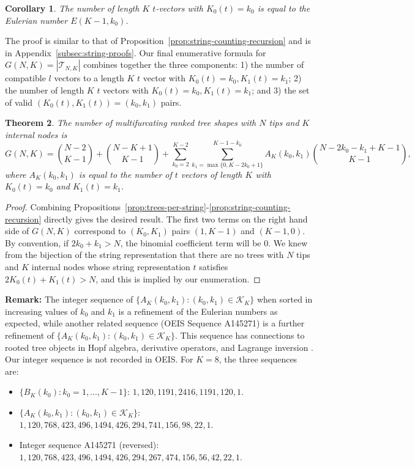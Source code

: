 \documentclass{article}
\newtheorem{theorem}{Theorem}
\newtheorem{corollary}[theorem]{Corollary}
\begin{document}
\begin{corollary}\label{eq:k0_cardinality}
The number of length $K$ $t$-vectors with $K_0(t)=k_0$ is equal to the Eulerian number $E(K-1, k_0)$.
\end{corollary}

The proof is similar to that of Proposition~\ref{prop:string-counting-recursion} and is in Appendix~\ref{subsec:string-proofs}. Our final enumerative formula for $G(N,K)=|\mathcal{T}_{N,K}|$ combines together the three components: 1) the number of compatible $l$ vectors to a length $K$ $t$ vector with $K_0(t)= k_0, K_1(t)= k_1$; 2) the number of length $K$ $t$ vectors with $K_0(t)= k_0, K_1(t)= k_1$; and 3) the set of valid $(K_0(t), K_1(t)) = (k_0, k_1)$ pairs. 

\begin{theorem} \label{thm:enumeration-result-final}
The number of multifurcating ranked tree shapes with $N$ tips and $K$ internal nodes is
\[ G(N,K) = \binom{N-2}{K-1}+\binom{N-K+1}{K-1}+\sum_{k_0=2}^{K-2} \sum^{K-1-k_{0}}_{k_1=\max\{0,K-2k_{0}+1\}} A_K(k_0, k_1) \binom{N-2k_0 - k_1 + K-1}{K-1}, \] where $A_K(k_0, k_1)$ is equal to the number of $t$ vectors of length $K$ with $K_0(t) = k_0$ and $K_1(t)=k_1$.
\end{theorem} 
\begin{proof} 
Combining Propositions~\ref{prop:trees-per-string}-\ref{prop:string-counting-recursion} directly gives the desired result. The first two terms on the right hand side of $G(N,K)$ correspond to $(K_{0},K_{1})$ pairs $(1,K-1)$ and $(K-1,0)$. By convention, if $2k_0+k_1 > N$, the binomial coefficient term will be 0. We knew from the bijection of the string representation that there are no trees with $N$ tips and $K$ internal nodes whose string representation $t$ satisfies $2K_0(t)+ K_1(t) >N$, and this is implied by our enumeration. 
\end{proof}

\noindent \textbf{Remark:} The integer sequence of $\{A_K(k_0,k_1): (k_0,k_1) \in \mathcal{K}_K\}$ when sorted in increasing values of $k_0$ and $k_1$ is a refinement of the Eulerian numbers as expected, while another related sequence (OEIS Sequence A145271) is a further refinement of $\{A_K(k_0, k_1): (k_0, k_1) \in \mathcal{K}_K\}$. This sequence has connections to rooted tree objects in Hopf algebra, derivative operators, and Lagrange inversion \citep{copeland2010mathemagical}. Our integer sequence is not recorded in OEIS. For $K=8$, the three sequences are:  
\begin{itemize}
    \item $\{ B_K(k_0): k_0=1,...,K-1\}$: $1, 120, 1191, 2416, 1191, 120, 1$.
    \item $\{A_K(k_0,k_1): (k_0,k_1) \in \mathcal{K}_K\}$: $1, 120, 768, 423, 496, 1494, 426, 294, 741, 156, 98, 22, 1$.
    \item Integer sequence A145271 (reversed): $1, 120, 768, 423, 496, 1494, 426, 294, 267, 474, 156, 56, 42, 22, 1$. 
\end{itemize}
\end{document}
